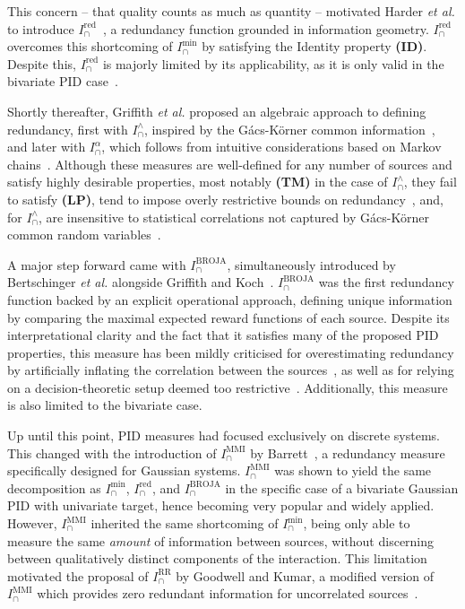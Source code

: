 \documentclass{article}
\makeatletter
\newcommand{\etal}{\textit{et al.\@} }
\newcommand{\ID}{\textbf{(ID)}\xspace} %
\newcommand{\TM}{\textbf{(TM)}\xspace} %
\newcommand{\LP}{\textbf{(LP)}\xspace}
\newcommand{\Imin}{\ensuremath{I_\cap^{\text{min}}}\xspace}
\newcommand{\Ired}{\ensuremath{I^{\text{red}}_\cap}\xspace}
\newcommand{\Iwedge}{\ensuremath{I_\cap^{\wedge}}\xspace}
\newcommand{\IBROJA}{\ensuremath{I_\cap^{\text{BROJA}}}\xspace}
\newcommand{\IMMI}{\ensuremath{I_\cap^{\text{MMI}}}\xspace}
\newcommand{\IRR}{\ensuremath{I_\cap^{\text{RR}}}\xspace}
\newcommand{\Ialpha}{\ensuremath{I_\cap^{\alpha}}\xspace}
\makeatother
\begin{document}
This concern -- that quality counts as much as quantity -- motivated Harder \etal to introduce \Ired~\cite{harder2013bivariate}, a redundancy function grounded in information geometry. \Ired overcomes this shortcoming of \Imin by satisfying the Identity property \ID. Despite this, \Ired is majorly limited by its applicability, as it is only valid in the bivariate PID case~\cite{harder2013bivariate}.

Shortly thereafter, Griffith \etal proposed an algebraic approach to defining redundancy, first with \Iwedge, inspired by the Gács-Körner common information~\cite{griffith2014quantifying}, and later with \Ialpha, which follows from intuitive considerations based on Markov chains~\cite{griffith2015quantifying}. Although these measures are well-defined for any number of sources and satisfy highly desirable properties, most notably \TM in the case of \Iwedge, they fail to satisfy \LP, tend to impose overly restrictive bounds on redundancy~\cite{griffith2015quantifying, kolchinsky2022novel}, and, for \Iwedge, are insensitive to statistical correlations not captured by G\'acs-K\"orner common random variables~\cite{james2018unique}.

A major step forward came with \IBROJA, simultaneously introduced by Bertschinger \etal alongside Griffith and Koch~\cite{bertschinger2014quantifying, griffith2014quantifying}. \IBROJA was the first redundancy function backed by an explicit operational approach, defining unique information by comparing the maximal expected reward functions of each source. Despite its interpretational clarity and the fact that it satisfies many of the proposed PID properties, this measure has been mildly criticised for overestimating redundancy by artificially inflating the correlation between the sources~\cite{ince2017measuring, james2018uniquekey, james2018unique}, as well as for relying on a decision-theoretic setup deemed too restrictive~\cite{ince2017measuring}. Additionally, this measure is also limited to the bivariate case.

Up until this point, PID measures had focused exclusively on discrete systems. This changed with the introduction of \IMMI by Barrett~\cite{barrett2015exploration}, a redundancy measure specifically designed for Gaussian systems. \IMMI was shown to yield the same decomposition as \Imin, \Ired, and \IBROJA in the specific case of a bivariate Gaussian PID with univariate target, hence becoming very popular and widely applied. However, \IMMI inherited the same shortcoming of \Imin, being only able to measure the same \textit{amount} of information between sources, without discerning between qualitatively distinct components of the interaction. This limitation motivated the proposal of \IRR by Goodwell and Kumar, a modified version of \IMMI which provides zero redundant information for uncorrelated sources~\cite{goodwell2017temporal}. 
\end{document}
